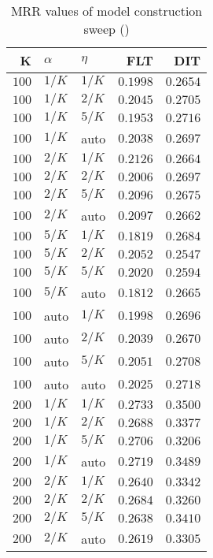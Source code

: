 
\begin{table}
\begin{spacing}{1.2}
\centering
\caption{MRR values of \openjpa model construction sweep (\cone)}
\label{table:openjpa_model_sweep}
\vspace{0.2em}
\parbox{.45\linewidth}{\centering \begin{tabular}{rll|rr}
\toprule
    K &  $\alpha$ &    $\eta$ &      FLT &      DIT \\
\midrule
$100$ &  $1/K$ &  $1/K$ & $0.1998$ & $0.2654$ \\
$100$ &  $1/K$ &  $2/K$ & $0.2045$ & $0.2705$ \\
$100$ &  $1/K$ &  $5/K$ & $0.1953$ & $0.2716$ \\
$100$ &  $1/K$ &   auto & $0.2038$ & $0.2697$ \\
$100$ &  $2/K$ &  $1/K$ & $0.2126$ & $0.2664$ \\
$100$ &  $2/K$ &  $2/K$ & $0.2006$ & $0.2697$ \\
$100$ &  $2/K$ &  $5/K$ & $0.2096$ & $0.2675$ \\
$100$ &  $2/K$ &   auto & $0.2097$ & $0.2662$ \\
$100$ &  $5/K$ &  $1/K$ & $0.1819$ & $0.2684$ \\
$100$ &  $5/K$ &  $2/K$ & $0.2052$ & $0.2547$ \\
$100$ &  $5/K$ &  $5/K$ & $0.2020$ & $0.2594$ \\
$100$ &  $5/K$ &   auto & $0.1812$ & $0.2665$ \\
$100$ &   auto &  $1/K$ & $0.1998$ & $0.2696$ \\
$100$ &   auto &  $2/K$ & $0.2039$ & $0.2670$ \\
$100$ &   auto &  $5/K$ & $0.2051$ & $0.2708$ \\
$100$ &   auto &   auto & $0.2025$ & $0.2718$ \\
$200$ &  $1/K$ &  $1/K$ & $0.2733$ & $0.3500$ \\
$200$ &  $1/K$ &  $2/K$ & $0.2688$ & $0.3377$ \\
$200$ &  $1/K$ &  $5/K$ & $0.2706$ & $0.3206$ \\
$200$ &  $1/K$ &   auto & $0.2719$ & $0.3489$ \\
$200$ &  $2/K$ &  $1/K$ & $0.2640$ & $0.3342$ \\
$200$ &  $2/K$ &  $2/K$ & $0.2684$ & $0.3260$ \\
$200$ &  $2/K$ &  $5/K$ & $0.2638$ & $0.3410$ \\
$200$ &  $2/K$ &   auto & $0.2619$ & $0.3305$ \\

\end{tabular}}
\end{spacing}
\end{table}
